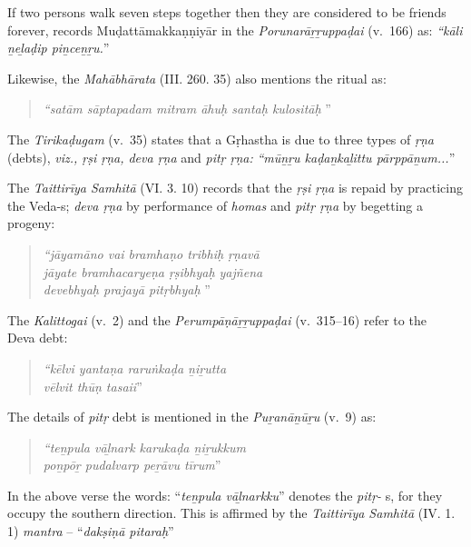 If two persons walk seven steps together then they are considered to be friends forever, records Muḍattāmakkaṇṇiyār in the \textit{Porunarāṟṟuppaḍai} (v.~166) as: \textit{“kāli ṉeḻaḍip piṉceṉṟu.}”

Likewise, the \textit{Mahābhārata} (III. 260. 35) also mentions the ritual as:

\begin{quote}
\textit{“satām sāptapadam mitram āhuḥ santaḥ kulositāḥ }”
\end{quote}

The \textit{Tirikaḍugam} (v.~35) states that a Gṛhastha is due to three types of \textit{ṛṇa} (debts), \textit{viz., ṛṣi ṛṇa, deva ṛṇa} and \textit{pitṛ ṛṇa:} \textit{“mūṉṟu kaḍaṉkaḻittu pārppāṉum...}”

The \textit{Taittirīya Samhitā} (VI. 3. 10) records that the \textit{ṛṣi ṛṇa} is repaid by practicing the Veda-s; \textit{deva ṛṇa} by performance of \textit{homas} and \textit{pitṛ ṛṇa} by begetting a progeny:

\begin{quote}
\textit{“jāyamāno vai bramhaṇo tribhiḥ ṛṇavā}\\\textit{jāyate bramhacaryeṇa ṛṣibhyaḥ yajñena}\\\textit{devebhyaḥ prajayā pitṛbhyaḥ }”
\end{quote}

The \textit{Kalittogai} (v.~2) and the \textit{Perumpāṇāṟṟuppaḍai} (v.~315–16) refer to the \\Deva debt:

\begin{quote}
\textit{“kēlvi yantaṇa raruṅkaḍa ṉiṟutta\\ vēlvit thūṇ tasaii}”
\end{quote}

The details of \textit{pitṛ} debt is mentioned in the \textit{Puṟanāṉūṟu} (v.~9) as:

\begin{quote}
\textit{“teṉpula vāḻnark karukaḍa ṉiṟukkum}\\\textit{poṉpōṟ pudalvarp peṟāvu tīrum}”
\end{quote}

In the above verse the words: “\textit{teṉpula vāḻnarkku}” denotes the \textit{pitṛ-} s, for they occupy the southern direction. This is affirmed by the \textit{Taittirīya Samhitā} (IV. 1. 1) \textit{mantra} – “\textit{dakṣiṇā pitaraḥ}”


